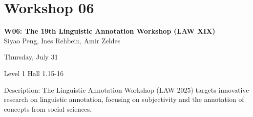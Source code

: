 \clearpage


\section[W06: The 19th Linguistic Annotation Workshop (LAW XIX)]{Workshop 06}
\label{workshop_6}

\begin{center}
    {\Large \textbf{W06: The 19th Linguistic Annotation Workshop (LAW XIX)}}\\

    Siyao Peng, Ines Rehbein, Amir Zeldes

    Thursday, July 31
    
   Level 1 Hall 1.15-16

\end{center}

Description: The Linguistic Annotation Workshop (LAW 2025) targets innovative research on linguistic annotation, focusing on subjectivity and the annotation of concepts from social sciences.

